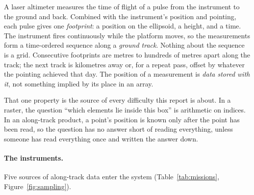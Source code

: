 \documentclass[10pt,a4paper]{article}
\begin{document}
A laser altimeter measures the time of flight of a pulse from the instrument to the ground and back. Combined with
the instrument's position and pointing, each pulse gives one \emph{footprint}: a position on the ellipsoid, a
height, and a time. The instrument fires continuously while the platform moves, so the measurements form a
time-ordered sequence along a \emph{ground track}. Nothing about the sequence is a grid. Consecutive footprints are
metres to hundreds of metres apart along the track; the next track is kilometres away or, for a repeat pass, offset
by whatever the pointing achieved that day. The position of a measurement is \emph{data stored with it}, not
something implied by its place in an array.

That one property is the source of every difficulty this report is about. In a raster, the question ``which
elements lie inside this box'' is arithmetic on indices. In an along-track product, a point's position is known only
after the point has been read, so the question has no answer short of reading everything, unless someone has read
everything once and written the answer down.

\paragraph{The instruments.} Five sources of along-track data enter the system (Table~\ref{tab:missions},
Figure~\ref{fig:sampling}).
\end{document}
